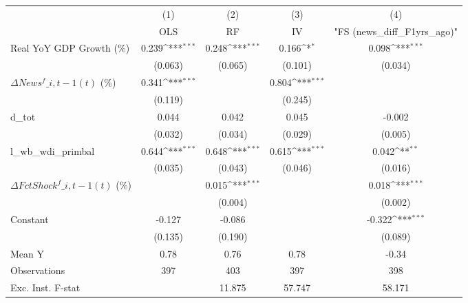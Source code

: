 {
\def\sym#1{\ifmmode^{#1}\else\(^{#1}\)\fi}
\begin{tabular}{l*{4}{c}}
\toprule
                    &\multicolumn{1}{c}{(1)}&\multicolumn{1}{c}{(2)}&\multicolumn{1}{c}{(3)}&\multicolumn{1}{c}{(4)}\\
                    &\multicolumn{1}{c}{OLS}&\multicolumn{1}{c}{RF}&\multicolumn{1}{c}{IV}&\multicolumn{1}{c}{ "FS (news\_diff\_F1yrs\_ago)" }\\
\midrule
Real YoY GDP Growth (\%)&       0.239\sym{***}&       0.248\sym{***}&       0.166\sym{*}  &       0.098\sym{***}\\
                    &     (0.063)         &     (0.065)         &     (0.101)         &     (0.034)         \\
\addlinespace
$ \Delta News^f\_{i,t-1}(t)$ (\%)&       0.341\sym{***}&                     &       0.804\sym{***}&                     \\
                    &     (0.119)         &                     &     (0.245)         &                     \\
\addlinespace
d\_tot               &       0.044         &       0.042         &       0.045         &      -0.002         \\
                    &     (0.032)         &     (0.034)         &     (0.029)         &     (0.005)         \\
\addlinespace
l\_wb\_wdi\_primbal    &       0.644\sym{***}&       0.648\sym{***}&       0.615\sym{***}&       0.042\sym{**} \\
                    &     (0.035)         &     (0.043)         &     (0.046)         &     (0.016)         \\
\addlinespace
$ \Delta FctShock^f\_{i,t-1}(t)$ (\%)&                     &       0.015\sym{***}&                     &       0.018\sym{***}\\
                    &                     &     (0.004)         &                     &     (0.002)         \\
\addlinespace
Constant            &      -0.127         &      -0.086         &                     &      -0.322\sym{***}\\
                    &     (0.135)         &     (0.190)         &                     &     (0.089)         \\
\midrule
Mean Y              &        0.78         &        0.76         &        0.78         &       -0.34         \\
Observations        &         397         &         403         &         397         &         398         \\
Exc. Inst. F-stat   &                     &      11.875         &      57.747         &      58.171         \\
\bottomrule
\end{tabular}
}
